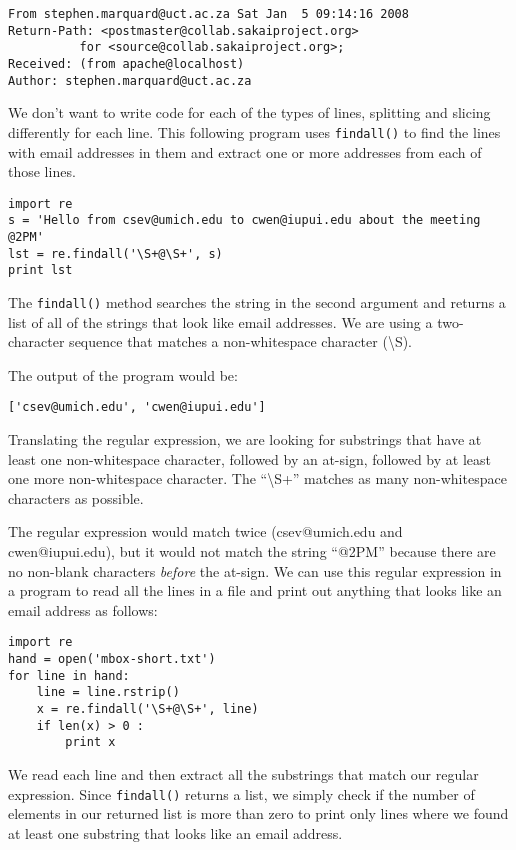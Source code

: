 \beforeverb
\begin{verbatim}
From stephen.marquard@uct.ac.za Sat Jan  5 09:14:16 2008
Return-Path: <postmaster@collab.sakaiproject.org>
          for <source@collab.sakaiproject.org>;
Received: (from apache@localhost)
Author: stephen.marquard@uct.ac.za
\end{verbatim}
\afterverb
%
We don't want to write code for each of the types of lines, splitting and slicing differently for each
line.  This following program uses {\tt findall()} to find the lines with email addresses in them and
extract one or more addresses from each of those lines.

\beforeverb
\begin{verbatim}
import re
s = 'Hello from csev@umich.edu to cwen@iupui.edu about the meeting @2PM'
lst = re.findall('\S+@\S+', s)
print lst
\end{verbatim}
\afterverb
%
The {\tt findall()} method searches the string in the second argument and returns a list of
all of the strings that look like email addresses.   We are using a two-character sequence
that matches a non-whitespace character ({\textbackslash}S).

The output of the program would be:

\beforeverb
\begin{verbatim}
['csev@umich.edu', 'cwen@iupui.edu']
\end{verbatim}
\afterverb
%
Translating the regular expression, we are looking for substrings that have at least one
non-whitespace character, followed by an at-sign, followed by at least one more non-whitespace
character.  The ``{\textbackslash}S+'' matches as many non-whitespace characters as possible.

The regular expression would match twice (csev@umich.edu and cwen@iupui.edu), but it would not
match the string ``@2PM'' because there are no non-blank characters {\em before} the at-sign.
We can use this regular expression in a program to read all the lines in a file and print out
anything that looks like an email address as follows:

\beforeverb
\begin{verbatim}
import re
hand = open('mbox-short.txt')
for line in hand:
    line = line.rstrip()
    x = re.findall('\S+@\S+', line)
    if len(x) > 0 :
        print x
\end{verbatim}
\afterverb
%
We read each line and then extract all the substrings that match our regular expression.
Since {\tt findall()} returns a list, we simply check if the number of elements in our returned
list is more than zero to print only lines where we found at least one substring that looks
like an email address.

